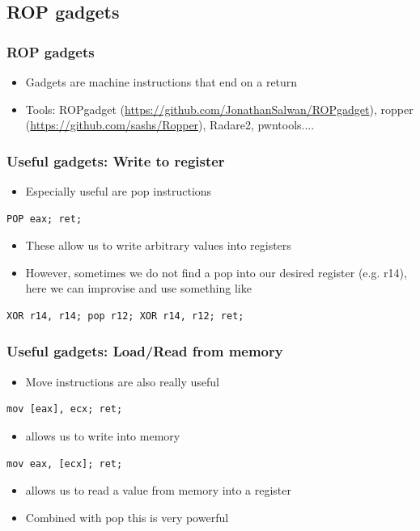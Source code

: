 \documentclass[11pt]{beamer}
\begin{document}
\subsection{ROP gadgets}
\begin{frame}
    \frametitle{ROP gadgets}
    \begin{itemize}
        \item Gadgets are machine instructions that end on a return
        \item Tools: ROPgadget (\url{https://github.com/JonathanSalwan/ROPgadget}), ropper (\url{https://github.com/sashs/Ropper}), Radare2, pwntools....
    \end{itemize}

\end{frame}

\begin{frame}[fragile]
    \frametitle{Useful gadgets: Write to register}
    \begin{itemize}
        \item Especially useful are pop instructions
    \end{itemize}
\begin{lstlisting}[style=result]
POP eax; ret;
\end{lstlisting}
    \begin{itemize}
        \item These allow us to write arbitrary values into registers
        \item However, sometimes we do not find a pop into our desired register (e.g. r14), here we can improvise and use something like
    \end{itemize}
\begin{lstlisting}[style=result]
XOR r14, r14; pop r12; XOR r14, r12; ret;
\end{lstlisting}
\end{frame}

\begin{frame}[fragile]
    \frametitle{Useful gadgets: Load/Read from memory}
    \begin{itemize}
        \item Move instructions are also really useful
    \end{itemize}
\begin{lstlisting}[style=result]
mov [eax], ecx; ret;
\end{lstlisting}
    \begin{itemize}
        \item allows us to write into memory
    \end{itemize}
\begin{lstlisting}[style=result]
mov eax, [ecx]; ret;
\end{lstlisting}
    \begin{itemize}
        \item allows us to read a value from memory into a register
        \item Combined with pop this is very powerful
    \end{itemize}
\end{frame}
\end{document}
